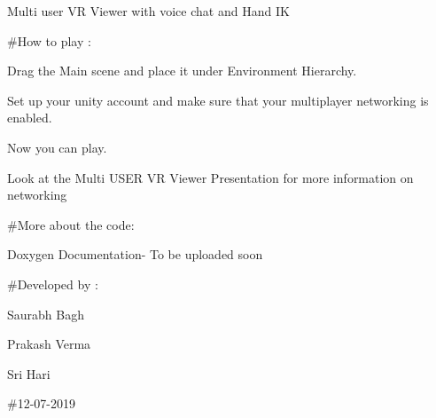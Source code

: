 Multi user VR Viewer with voice chat and Hand IK

\#\+How to play \+:

Drag the Main scene and place it under Environment Hierarchy.

Set up your unity account and make sure that your multiplayer networking is enabled.

Now you can play.

Look at the Multi U\+S\+ER VR Viewer Presentation for more information on networking

\#\+More about the code\+:

Doxygen Documentation-\/ To be uploaded soon

\#\+Developed by \+:

Saurabh Bagh

Prakash Verma

Sri Hari

\#12-\/07-\/2019 